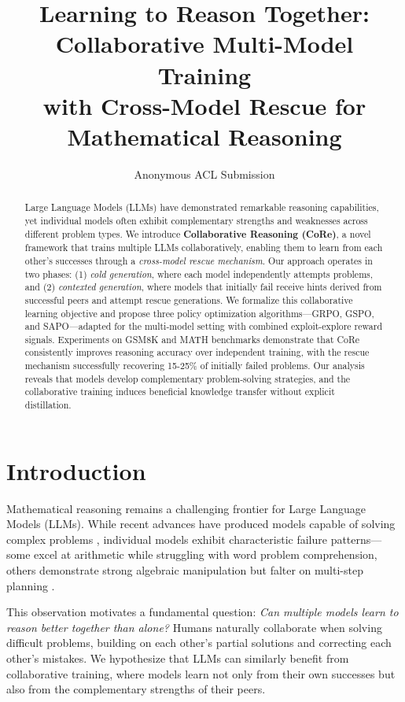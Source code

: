 \documentclass[11pt]{article}
\title{Learning to Reason Together: Collaborative Multi-Model Training\\with Cross-Model Rescue for Mathematical Reasoning}
\author{Anonymous ACL Submission}
\newcommand{\methodname}{CoRe}
\newcommand{\fullmethodname}{Collaborative Reasoning}
\begin{document}
\maketitle

\begin{abstract}
Large Language Models (LLMs) have demonstrated remarkable reasoning capabilities, yet individual models often exhibit complementary strengths and weaknesses across different problem types. We introduce \textbf{\fullmethodname{} (\methodname{})}, a novel framework that trains multiple LLMs collaboratively, enabling them to learn from each other's successes through a \emph{cross-model rescue mechanism}. Our approach operates in two phases: (1) \emph{cold generation}, where each model independently attempts problems, and (2) \emph{contexted generation}, where models that initially fail receive hints derived from successful peers and attempt rescue generations. We formalize this collaborative learning objective and propose three policy optimization algorithms---GRPO, GSPO, and SAPO---adapted for the multi-model setting with combined exploit-explore reward signals. Experiments on GSM8K and MATH benchmarks demonstrate that \methodname{} consistently improves reasoning accuracy over independent training, with the rescue mechanism successfully recovering 15-25\% of initially failed problems. Our analysis reveals that models develop complementary problem-solving strategies, and the collaborative training induces beneficial knowledge transfer without explicit distillation.
\end{abstract}

\section{Introduction}

Mathematical reasoning remains a challenging frontier for Large Language Models (LLMs). While recent advances have produced models capable of solving complex problems \citep{openai2023gpt4, touvron2023llama, team2023gemini}, individual models exhibit characteristic failure patterns---some excel at arithmetic while struggling with word problem comprehension, others demonstrate strong algebraic manipulation but falter on multi-step planning \citep{cobbe2021gsm8k, hendrycks2021math}.

This observation motivates a fundamental question: \emph{Can multiple models learn to reason better together than alone?} Humans naturally collaborate when solving difficult problems, building on each other's partial solutions and correcting each other's mistakes. We hypothesize that LLMs can similarly benefit from collaborative training, where models learn not only from their own successes but also from the complementary strengths of their peers.
\end{document}
